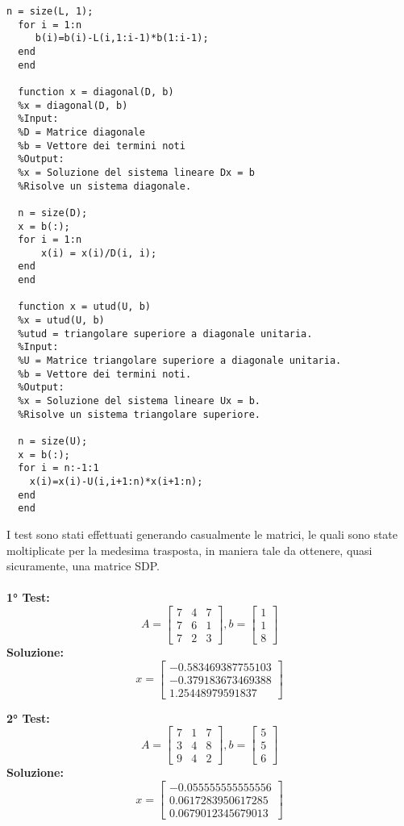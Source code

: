 \documentclass[10pt,a4paper]{article}
\begin{document}
\begin{lstlisting}[style=Matlab-editor]
  n = size(L, 1);
  for i = 1:n
     b(i)=b(i)-L(i,1:i-1)*b(1:i-1);
  end
  end
      
  function x = diagonal(D, b)
  %x = diagonal(D, b)
  %Input:
  %D = Matrice diagonale
  %b = Vettore dei termini noti
  %Output:
  %x = Soluzione del sistema lineare Dx = b
  %Risolve un sistema diagonale.
  
  n = size(D);
  x = b(:);
  for i = 1:n
      x(i) = x(i)/D(i, i);
  end
  end
      
  function x = utud(U, b)
  %x = utud(U, b)
  %utud = triangolare superiore a diagonale unitaria.
  %Input:
  %U = Matrice triangolare superiore a diagonale unitaria.
  %b = Vettore dei termini noti.
  %Output:
  %x = Soluzione del sistema lineare Ux = b.
  %Risolve un sistema triangolare superiore.
  
  n = size(U);
  x = b(:);
  for i = n:-1:1
    x(i)=x(i)-U(i,i+1:n)*x(i+1:n);
  end
  end
\end{lstlisting}

I test sono stati effettuati generando casualmente le matrici, le quali sono state moltiplicate per la medesima trasposta,
in maniera tale da ottenere, quasi sicuramente, una matrice SDP.
\\ \\
\textbf{1° Test:}
\[
  A =
  \begin{bmatrix}
    7 & 4 & 7 \\
    7 & 6 & 1 \\
    7 & 2 & 3
  \end{bmatrix},
  b =
  \begin{bmatrix}
    1 \\ 1 \\ 8
  \end{bmatrix}
\]
\textbf{Soluzione:}
\[
  x =
  \begin{bmatrix}
    -0.583469387755103  \\
    -0.379183673469388 \\
    1.25448979591837
  \end{bmatrix}
\]

\textbf{2° Test:}
\[
  A =
  \begin{bmatrix}
    7 & 1 & 7 \\
    3 & 4 & 8 \\
    9 & 4 & 2
  \end{bmatrix},
  b =
  \begin{bmatrix}
    5 \\ 5 \\ 6
  \end{bmatrix}
\]
\textbf{Soluzione:}
\[
  x =
  \begin{bmatrix}
    -0.055555555555556 \\
    0.0617283950617285 \\
    0.0679012345679013
  \end{bmatrix}
\]
\end{document}
